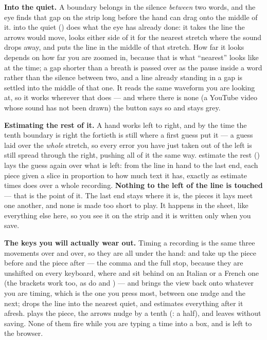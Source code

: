 \documentclass[11pt,oneside]{report}
\newcommand{\key}[1]{\textsf{\small\fbox{#1}}}
\newcommand{\menu}[1]{\textsf{#1}}
\begin{document}
\textbf{Into the quiet.} A boundary belongs in the silence \emph{between}
two words, and the eye finds that gap on the strip long before the hand can
drag onto the middle of it. \menu{into the quiet} (\key{S}) does what the
eye has already done: it takes the line the arrows would move, looks either
side of it for the nearest stretch where the sound drops away, and puts the
line in the middle of that stretch. How far it looks depends on how far you
are zoomed in, because that is what ``nearest'' looks like at the time; a
gap shorter than a breath is passed over as the pause inside a word rather
than the silence between two, and a line already standing in a gap is
settled into the middle of that one. It reads the same waveform you are
looking at, so it works wherever that does --- and where there is none (a
YouTube video whose sound has not been drawn) the button says so and stays
grey.

\textbf{Estimating the rest of it.} A hand works left to right, and by the
time the tenth boundary is right the fortieth is still where a first guess
put it --- a guess laid over the \emph{whole} stretch, so every error you
have just taken out of the left is still spread through the right, pushing
all of it the same way. \menu{estimate the rest} (\key{E}) lays the guess
again over what is left: from the line in hand to the last end, each piece
given a slice in proportion to how much text it has, exactly as
\menu{estimate times} does over a whole recording. \textbf{Nothing to the
left of the line is touched} --- that is the point of it. The last end stays
where it is, the pieces it lays meet one another, and none is made too
short to play. It happens in the sheet, like everything else here, so you
see it on the strip and it is written only when you save.

\textbf{The keys you will actually wear out.} Timing a recording is the same
three movements over and over, so they are all under the hand:
\key{,} and \key{.} take up the piece before and the piece after --- the
comma and the full stop, because they are unshifted on every keyboard, where
\key{[} and \key{]} sit behind \key{AltGr} on an Italian or a French one
(the brackets work too, as do \key{PageUp} and \key{PageDown}) --- and
\key{F} brings the view back onto whatever you are timing, which is the one
you press most, between one nudge and the next; \key{S} drops the line into
the nearest quiet, and \key{E} estimates everything after it afresh. \key{Space} plays the piece,
the arrows nudge by a tenth (\key{Shift}: a half), and \key{Escape} leaves
without saving. None of them fire while you are typing a time into a box,
and \key{Ctrl+F} is left to the browser.
\end{document}
